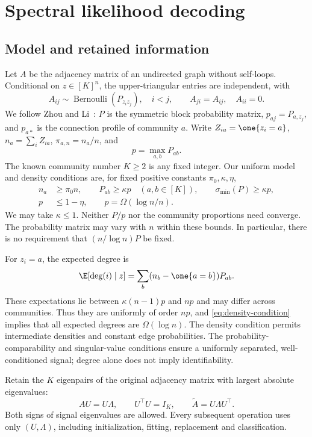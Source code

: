 \section{Spectral likelihood decoding}
\label{sec:algorithm}

\subsection{Model and retained information}
Let $A$ be the adjacency matrix of an undirected graph without self-loops. Conditional on $z\in[K]^n$, the upper-triangular entries are independent, with
\begin{equation}
 A_{ij}\sim\operatorname{Bernoulli}(P_{z_i z_j}),\quad i<j,
 \qquad A_{ji}=A_{ij},\quad A_{ii}=0.
 \label{eq:sbm}
\end{equation}
We follow Zhou and Li~\citep{zhouli2020}: $P$ is the symmetric block probability matrix, $p_{aj}=P_{a,z_j}$, and $p_{a*}$ is the connection profile of community $a$. Write $Z_{ia}=\one\{z_i=a\}$, $n_a=\sum_iZ_{ia}$, $\pi_{a,n}=n_a/n$, and
\[
 p=\max_{a,b}P_{ab}.
\]
The known community number $K\ge2$ is any fixed integer. Our uniform model and density conditions are, for fixed positive constants $\pi_0,\kappa,\eta$,
\begin{align}
 n_a&\ge\pi_0n,\qquad P_{ab}\ge\kappa p\quad(a,b\in[K]),\qquad
 \sigma_{\min}(P)\ge\kappa p,
 \label{eq:model-conditions}\\
 p&\le1-\eta,\qquad p=\Omega(\log n/n).
 \label{eq:density-condition}
\end{align}
We may take $\kappa\le1$. Neither $P/p$ nor the community proportions need converge. The probability matrix may vary with $n$ within these bounds. In particular, there is no requirement that $(n/\log n)P$ be fixed.

For $z_i=a$, the expected degree is
\begin{equation}
 \E[\deg(i)\mid z]
   =\sum_b(n_b-\one\{a=b\})P_{ab}.
 \label{eq:expected-degree}
\end{equation}
These expectations lie between $\kappa(n-1)p$ and $np$ and may differ across communities. Thus they are uniformly of order $np$, and \eqref{eq:density-condition} implies that all expected degrees are $\Omega(\log n)$. The density condition permits intermediate densities and constant edge probabilities. The probability-comparability and singular-value conditions ensure a uniformly separated, well-conditioned signal; degree alone does not imply identifiability.

Retain the $K$ eigenpairs of the original adjacency matrix with largest absolute eigenvalues:
\begin{equation}
 AU=U\Lambda,\qquad U^\top U=I_K,\qquad
 \widetilde A=U\Lambda U^\top.
 \label{eq:representation}
\end{equation}
Both signs of signal eigenvalues are allowed. Every subsequent operation uses only $(U,\Lambda)$, including initialization, fitting, replacement and classification.

